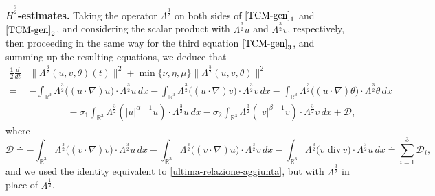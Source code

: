 \documentclass[a4paper]{article}
\newcommand{\dx}{\, dx}
\newcommand{\R}{\mathbb{R}}
\providecommand{\dv}{\,\mathrm{div}\,}
\begin{document}
\smallskip

\noindent \textbf{$\dot{H}^{\frac{3}{2}}$-estimates.}
Taking the operator $\Lambda^{\frac{3}{2}}$ on both sides of
$\eqref{TCM-gen}_1$ and $\eqref{TCM-gen}_2$, and considering the scalar
product with $\Lambda^{\frac{3}{2}} u$ and $\Lambda^{\frac{3}{2}} v$,
respectively, then proceeding in the same way for the third equation
$\eqref{TCM-gen}_3$, and summing up the resulting equations, we deduce
that
\begin{equation} \label{H3/2-stima-diff}
  \begin{aligned}
    \frac{1}{2} \frac{d}{dt} & \|\Lambda^{\frac{3}{2}} (u, v, \theta)
    (t) \|^2 + \min\{\nu, \eta, \mu\} \|\Lambda^{\frac{5}{2}} (u, v,
    \theta)\|^2
    \\
    = & -\int_{\R^3}\Lambda^{\frac{3}{2}}\big( (u\cdot \nabla) u\big)
    \cdot \Lambda^{\frac{3}{2}}u \dx -
    \int_{\R^3}\Lambda^{\frac{3}{2}}\big( (u\cdot \nabla) v\big) \cdot
    \Lambda^{\frac{3}{2}}v \dx - \int_{\R^3}\Lambda^{\frac{3}{2}}\big(
    (u \cdot \nabla) \theta\big) \cdot \Lambda^{\frac{3}{2}}\theta \dx
    \\
    &\qquad \qquad -
    \sigma_1\int_{\R^3}\Lambda^{\frac{3}{2}}(|u|^{\alpha-1}u)\cdot
    \Lambda^{\frac{3}{2}} u \dx -
    \sigma_2\int_{\R^3}\Lambda^{\frac{3}{2}}(|v|^{\beta-1}v)\cdot
    \Lambda^{\frac{3}{2}} v \dx +\mathcal{D},
  \end{aligned}
\end{equation}
where
%
\begin{equation*}
  \mathcal{D}\doteq -\int_{\R^3}\Lambda^{\frac{3}{2}}\big( (v\cdot \nabla) v\big) \cdot
  \Lambda^{\frac{3}{2}}u \dx - \int_{\R^3}\Lambda^{\frac{3}{2}}\big( (v\cdot \nabla) u\big)
  \cdot \Lambda^{\frac{3}{2}}v \dx - \int_{\R^3}\Lambda^{\frac{3}{2}}\big( v \,\dv v\big)
  \cdot \Lambda^{\frac{3}{2}} u \dx \doteq \sum_{i=1}^{3} \mathcal{D}_i,
\end{equation*}
and we used the identity equivalent to 
\eqref{ultima-relazione-aggiunta}, but with $\Lambda^{\frac32}$ in place of $\Lambda^{\frac12}$.
\end{document}
